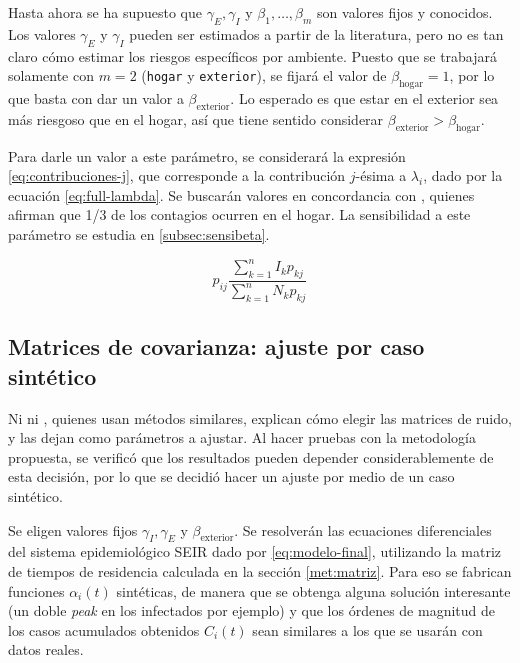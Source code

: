 Hasta ahora se ha supuesto que \(\gamma_E, \gamma_I\) y \(\beta_1, \dots, \beta_m\) son valores fijos y conocidos. Los valores \(\gamma_E\) y \(\gamma_I\) pueden ser estimados a partir de la literatura, pero no es tan claro cómo estimar los riesgos específicos por ambiente. Puesto que se trabajará solamente con \(m= 2\) (\texttt{hogar} y \texttt{exterior}), se fijará el valor de \(\beta_{\text{hogar}} = 1\), por lo que basta con dar un valor a \(\beta_{\text{exterior}}\). Lo esperado es que estar en el exterior sea más riesgoso que en el hogar, así que tiene sentido considerar \(\beta_{\text{exterior}} > \beta_{\text{hogar}}\). 

Para darle un valor a este parámetro, se considerará la expresión \ref{eq:contribuciones-j}, que corresponde a la contribución \(j\)-ésima a \(\lambda_i\), dado por la ecuación \ref{eq:full-lambda}. Se buscarán valores en concordancia con \cite{Ferguson2020}\cite{Mossong2008}, quienes afirman que 1/3 de los contagios ocurren en el hogar. La sensibilidad a este parámetro se estudia en \ref{subsec:sensibeta}.

\begin{equation}\label{eq:contribuciones-j}
 p_{ij} \frac{\sum_{k = 1}^n I_{k} p_{kj}}{\sum_{k = 1}^n N_{k} p_{kj}}
\end{equation}





\subsection{Matrices de covarianza: ajuste por caso sintético}\label{met-subsec:sintetico}

Ni \cite{Hasan2020} ni \cite{Sameni2020}, quienes usan métodos similares, explican cómo elegir las matrices de ruido, y las dejan como parámetros a ajustar. Al hacer pruebas con la metodología propuesta, se verificó que los resultados pueden depender considerablemente de esta decisión, por lo que se decidió hacer un ajuste por medio de un caso sintético.


Se eligen valores fijos \(\gamma_I, \gamma_E\) y \(\beta_{\text{exterior}}\). Se resolverán las ecuaciones diferenciales del sistema epidemiológico SEIR dado por \ref{eq:modelo-final}, utilizando la matriz de tiempos de residencia calculada en la sección \ref{met:matriz}. Para eso se fabrican funciones \(\alpha_i(t)\) sintéticas, de manera que se obtenga alguna solución interesante (un doble \textit{peak} en los infectados por ejemplo) y que los órdenes de magnitud de los casos acumulados obtenidos \(C_i(t)\) sean similares a los que se usarán con datos reales.

